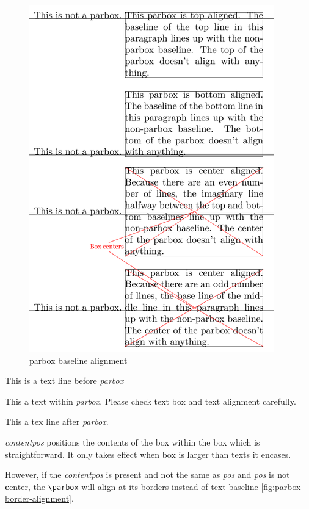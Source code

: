 \begin{figure}[!htbp]
  \centering
  \includegraphics{parbox_baseline_alignment}
  \caption{parbox baseline alignment}
  \label{fig:parbox-baseline-alignment}
\end{figure}

This is a text line before \textit{parbox}
\parbox[t][2cm][t]{5cm}{This a text within \textit{parbox}. Please
  check text box and text alignment carefully.} This a tex line
after \textit{parbox}.

\textit{contentpos} positions the contents of the box within the
box which is straightforward. It only takes effect when box is
larger than texts it encases.

However, if the \textit{contentpos} is present and not the same as
\textit{pos} and \textit{pos} is not \textbf{c}enter, the
\verb|\parbox| will align at its borders instead of text baseline
\ref{fig:parbox-border-alignment}.

